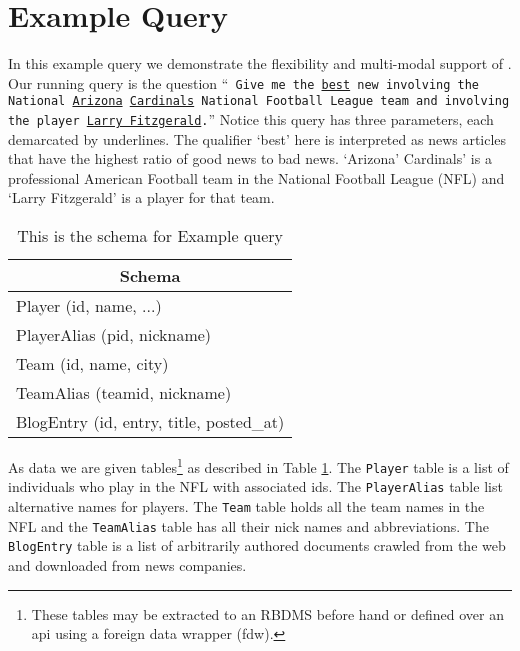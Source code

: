 
\section{Example Query}

In this example query we demonstrate the flexibility and multi-modal 
support of \system. Our running query is the question
``{\tt
Give me the \underline{best} new 
involving the National \underline{Arizona} \underline{Cardinals} 
National Football League team and involving the 
player \underline{Larry Fitzgerald}.}''
Notice this query has three parameters, each demarcated by underlines.
The qualifier `best' here is interpreted as news articles that have the 
highest ratio of good news to bad news.
`Arizona' Cardinals' is a professional American Football team in the National
Football League (NFL) and `Larry Fitzgerald' is a player for that team.

\begin{table}
\begin{center}
\begin{tabular}{|l|}
\hline
\multicolumn{1}{|c|}{Schema}\\
\hline
Player (id, name, ...)\\
\hline
PlayerAlias (pid, nickname)\\
\hline
Team (id, name, city)\\
\hline
TeamAlias (teamid, nickname)\\
\hline
BlogEntry (id, entry, title, posted\_at)\\
\hline
\end{tabular}
\end{center}
\caption{This is the schema for Example query}
\label{tab:schema}
\end{table}

As data we are given tables\footnote{These
tables may be extracted to an RBDMS before hand or defined over an api using
a foreign data wrapper (fdw). }
as described in Table \ref{tab:schema}.
The {\tt Player} table is a list of individuals who play in the NFL with
associated ids. The {\tt PlayerAlias} table list alternative names for players.
The {\tt Team} table holds all the team names in the NFL and the {\tt TeamAlias}
table has all their nick names and abbreviations. The {\tt BlogEntry} table
is a list of arbitrarily authored documents crawled from the web and downloaded
from news companies.




